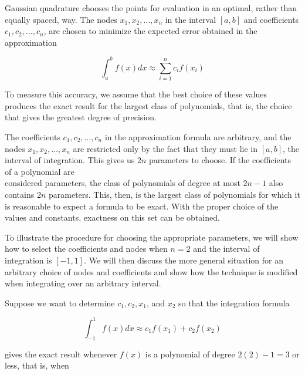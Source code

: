 
Gaussian quadrature chooses the points for evaluation in an optimal, rather than equally spaced, way. The nodes $x_{1}, x_{2}, \ldots, x_{n}$ in the interval $[a, b]$ and coefficients $c_{1}, c_{2}, \ldots, c_{n}$, are chosen to minimize the expected error obtained in the approximation

$$
\int_{a}^{b} f(x) d x \approx \sum_{i=1}^{n} c_{i} f\left(x_{i}\right)
$$

To measure this accuracy, we assume that the best choice of these values produces the exact result for the largest class of polynomials, that is, the choice that gives the greatest degree of precision.

The coefficients $c_{1}, c_{2}, \ldots, c_{n}$ in the approximation formula are arbitrary, and the nodes $x_{1}, x_{2}, \ldots, x_{n}$ are restricted only by the fact that they must lie in $[a, b]$, the interval of integration. This gives us $2 n$ parameters to choose. If the coefficients of a polynomial are\\
considered parameters, the class of polynomials of degree at most $2 n-1$ also contains $2 n$ parameters. This, then, is the largest class of polynomials for which it is reasonable to expect a formula to be exact. With the proper choice of the values and constants, exactness on this set can be obtained.

To illustrate the procedure for choosing the appropriate parameters, we will show how to select the coefficients and nodes when $n=2$ and the interval of integration is $[-1,1]$. We will then discuss the more general situation for an arbitrary choice of nodes and coefficients and show how the technique is modified when integrating over an arbitrary interval.

Suppose we want to determine $c_{1}, c_{2}, x_{1}$, and $x_{2}$ so that the integration formula

$$
\int_{-1}^{1} f(x) d x \approx c_{1} f\left(x_{1}\right)+c_{2} f\left(x_{2}\right)
$$

gives the exact result whenever $f(x)$ is a polynomial of degree $2(2)-1=3$ or less, that is, when

